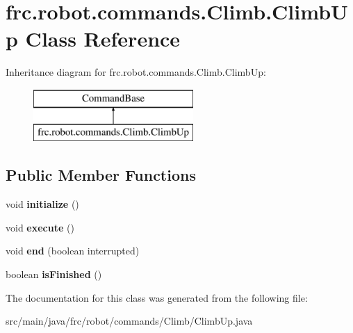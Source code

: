 \hypertarget{classfrc_1_1robot_1_1commands_1_1_climb_1_1_climb_up}{}\section{frc.\+robot.\+commands.\+Climb.\+Climb\+Up Class Reference}
\label{classfrc_1_1robot_1_1commands_1_1_climb_1_1_climb_up}
Inheritance diagram for frc.\+robot.\+commands.\+Climb.\+Climb\+Up\+:\begin{figure}[H]
\begin{center}
\leavevmode
\includegraphics[height=2.000000cm]{classfrc_1_1robot_1_1commands_1_1_climb_1_1_climb_up}
\end{center}
\end{figure}
\subsection*{Public Member Functions}
\begin{DoxyCompactItemize}
\item 
\mbox{\label{classfrc_1_1robot_1_1commands_1_1_climb_1_1_climb_up_a05562437bb6ac04ac5a0ca0c3a9f7048}} 
void {\bfseries initialize} ()
\item 
\mbox{\label{classfrc_1_1robot_1_1commands_1_1_climb_1_1_climb_up_a3ea37735883320fd5330fd531d2cdd87}} 
void {\bfseries execute} ()
\item 
\mbox{\label{classfrc_1_1robot_1_1commands_1_1_climb_1_1_climb_up_a12ef85b7f1a609f8eeffa449cb187bcf}} 
void {\bfseries end} (boolean interrupted)
\item 
\mbox{\label{classfrc_1_1robot_1_1commands_1_1_climb_1_1_climb_up_a92f924b714085436042b3bbf35c062cc}} 
boolean {\bfseries is\+Finished} ()
\end{DoxyCompactItemize}


The documentation for this class was generated from the following file\+:\begin{DoxyCompactItemize}
\item 
src/main/java/frc/robot/commands/\+Climb/Climb\+Up.\+java\end{DoxyCompactItemize}
